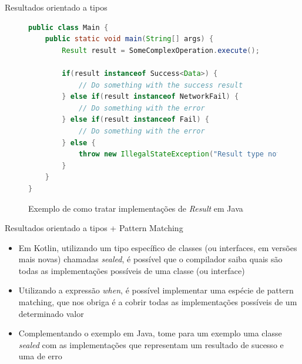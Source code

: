 \documentclass[brazilian]{beamer}
\begin{document}
\begin{frame}[fragile]{Resultados orientado a tipos}
    \begin{figure}[H]
        \centering
        \begin{lstlisting}[language=Java]
public class Main {
    public static void main(String[] args) {
        Result result = SomeComplexOperation.execute();
        
        if(result instanceof Success<Data>) {
            // Do something with the success result
        } else if(result instanceof NetworkFail) {
            // Do something with the error
        } else if(result instanceof Fail) {
            // Do something with the error
        } else {
            throw new IllegalStateException("Result type not implemented")
        }
    }
}
        \end{lstlisting}
        \caption{Exemplo de como tratar implementações de \emph{Result} em Java}
        \label{fig:java_if_else_statements_with_new_type}
    \end{figure}
\end{frame}

\begin{frame}[fragile]{Resultados orientado a tipos + Pattern Matching}
    \begin{itemize}
        \item Em Kotlin, utilizando um tipo específico de classes (ou interfaces, em versões mais novas) chamadas \textit{sealed}, é possível que o compilador saiba quais são todas as implementações possíveis de uma classe (ou interface)
        \item Utilizando a expressão \emph{when}, é possível implementar uma espécie de pattern matching, que nos obriga é a cobrir todas as implementações possíveis de um determinado valor
        \item Complementando o exemplo em Java, tome para um exemplo uma classe \emph{sealed} com as implementações que representam um resultado de sucesso e uma de erro
    \end{itemize}
\end{frame}
\end{document}
